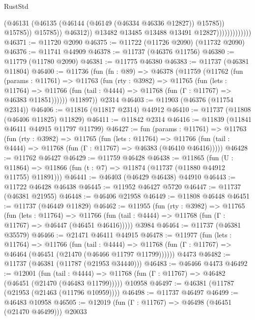 \begin{lexlean}{RustStd}
\begin{coremodule}
                                        (@46131
                                          (@46135 (@46144 (@46149 (@46334 @46336 @12827)) @15785))
                                          @15785))
                                      @15785))
                                  @46312))
                              @13482
                              @13485
                              @13488
                              @13491
                              @12827)))))))))))))
@46371 := @11720 @2090
@46375 := @11722 (@11726 @2090) (@11732 @2090)
@46376 := @11741 @44909
@46378 := @11737 (@46376 @11756)
@46380 := @11779 (@11780 @2090)
@46381 := @11775 @46380
@46383 := @11737 (@46381 @11804)
@46400 := @11736
    (fun (fn : @89) =>
    @46378
      (@11759
        (@11762
          (fun (params : @11761) =>
          @11763
            (fun (rty : @3982) =>
            @11765
              (fun (lets : @11764) =>
              @11766 (fun (tail : @4444) => @11768 (fun (Γ : @11767) => @46383 @11851))))))
        @11897))
    @2314
@46403 := @11903 (@46376 (@11754 @2314))
@46406 := @11816 (@11817 @2314) @44912
@46410 := @11737 (@11808 (@46406 @11825) @11829)
@46411 := @11842 @2314
@46416 := @11839 (@11841 @46411 @44915 @11797 @11799)
@46427 := fun (params : @11761) =>
  @11763
    (fun (rty : @3982) =>
    @11765
      (fun (lets : @11764) =>
      @11766 (fun (tail : @4444) => @11768 (fun (Γ : @11767) => @46383 (@46410 @46416)))))
@46428 := @11762 @46427
@46429 := @11759 @46428
@46438 := @11865
    (fun (U : @11864) => @11866 (fun (t : @7) => @11874 (@11737 (@11880 @44912 @11755) @11891)))
@46441 := @46403 (@46429 @46438) @44910
@46443 := @11722 @46428 @46438
@46445 := @11952 @46427 @5720
@46447 := @11737 (@46381 @21955)
@46448 := @46406 @21958
@46449 := @11808 @46448
@46451 := @11737 (@46449 @11829)
@46462 := @11955
    (fun (rty : @3982) =>
    @11765
      (fun (lets : @11764) =>
      @11766 (fun (tail : @4444) => @11768 (fun (Γ : @11767) => @46447 (@46451 @46416)))))
    @3984
@46464 := @11737 (@46381 @35579)
@46466 := @21471 @46411 @44915
@46478 := @11977
    (fun (lets : @11764) =>
    @11766
      (fun (tail : @4444) =>
      @11768 (fun (Γ : @11767) => @46464 (@46451 (@21470 (@46466 @11797 @11799))))))
    @4473
@46482 := @11737 (@46381 (@11787 (@21953 @34440)))
@46483 := @46466 @4473
@46492 := @12001
    (fun (tail : @4444) => @11768 (fun (Γ : @11767) => @46482 (@46451 (@21470 (@46483 @11799)))))
    @10958
@46497 := @46381 (@11787 (@21953 (@21463 (@11796 @10959))))
@46498 := @11737 @46497
@46499 := @46483 @10958
@46505 := @12019 (fun (Γ : @11767) => @46498 (@46451 (@21470 @46499))) @20033

\end{coremodule}
\end{lexlean}
